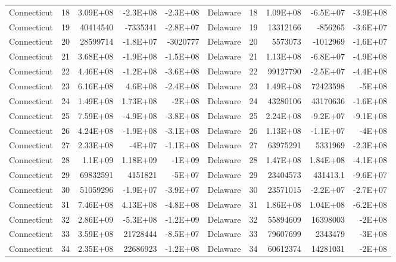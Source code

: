 \begin{table}[]
\begin{tabular}{lrrrrlrrrr}
		Connecticut &  18 & 3.09E+08 & -2.3E+08 & -2.3E+08 & Delaware &  18 & 1.09E+08 & -6.5E+07 & -3.9E+08 \\
		Connecticut &  19 & 40414540 & -7335341 & -2.8E+07 & Delaware &  19 & 13312166 & -856265 & -3.6E+07 \\
		Connecticut &  20 & 28599714 & -1.8E+07 & -3020777 & Delaware &  20 & 5573073 & -1012969 & -1.6E+07 \\
		Connecticut &  21 & 3.68E+08 & -1.9E+08 & -1.5E+08 & Delaware &  21 & 1.13E+08 & -6.8E+07 & -4.9E+08 \\
		Connecticut &  22 & 4.46E+08 & -1.2E+08 & -3.6E+08 & Delaware &  22 & 99127790 & -2.5E+07 & -4.4E+08 \\
		Connecticut &  23 & 6.16E+08 & 4.6E+08 & -2.4E+08 & Delaware &  23 & 1.49E+08 & 72423598 & -5E+08 \\
		Connecticut &  24 & 1.49E+08 & 1.73E+08 & -2E+08 & Delaware &  24 & 43280106 & 43170636 & -1.6E+08 \\
		Connecticut &  25 & 7.59E+08 & -4.9E+08 & -3.8E+08 & Delaware &  25 & 2.24E+08 & -9.2E+07 & -9.1E+08 \\
		Connecticut &  26 & 4.24E+08 & -1.9E+08 & -3.1E+08 & Delaware &  26 & 1.13E+08 & -1.1E+07 & -4E+08 \\
		Connecticut &  27 & 2.33E+08 & -4E+07 & -1.1E+08 & Delaware &  27 & 63975291 & 5331969 & -2.3E+08 \\
		Connecticut &  28 & 1.1E+09 & 1.18E+09 & -1E+09 & Delaware &  28 & 1.47E+08 & 1.84E+08 & -4.1E+08 \\
		Connecticut &  29 & 69832591 & 4151821 & -5E+07 & Delaware &  29 & 23404573 & 431413.1 & -9.6E+07 \\
		Connecticut &  30 & 51059296 & -1.9E+07 & -3.9E+07 & Delaware &  30 & 23571015 & -2.2E+07 & -2.7E+07 \\
		Connecticut &  31 & 7.46E+08 & 4.13E+08 & -4.8E+08 & Delaware &  31 & 1.86E+08 & 1.04E+08 & -6.2E+08 \\
		Connecticut &  32 & 2.86E+09 & -5.3E+08 & -1.2E+09 & Delaware &  32 & 55894609 & 16398003 & -2E+08 \\
		Connecticut &  33 & 3.59E+08 & 21728444 & -8.5E+07 & Delaware &  33 & 79607699 & 2343479 & -3E+08 \\
		Connecticut &  34 & 2.35E+08 & 22686923 & -1.2E+08 & Delaware &  34 & 60612374 & 14281031 & -2E+08
	\end{tabular}
\end{table}

